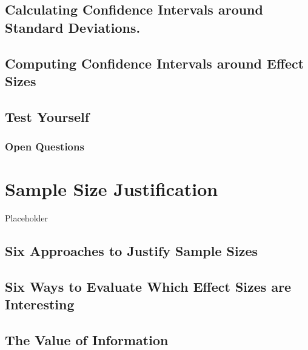 \documentclass[
  oneside]{krantz}
\begin{document}
\hypertarget{calculating-confidence-intervals-around-standard-deviations.}{%
\subsection{Calculating Confidence Intervals around Standard
Deviations.}\label{calculating-confidence-intervals-around-standard-deviations.}}

\hypertarget{computing-confidence-intervals-around-effect-sizes}{%
\subsection{Computing Confidence Intervals around Effect
Sizes}\label{computing-confidence-intervals-around-effect-sizes}}

\hypertarget{test-yourself-5}{%
\subsection{Test Yourself}\label{test-yourself-5}}

\hypertarget{open-questions-5}{%
\subsubsection{Open Questions}\label{open-questions-5}}

\hypertarget{power}{%
\section{Sample Size Justification}\label{power}}

Placeholder

\hypertarget{six-approaches-to-justify-sample-sizes}{%
\subsection{Six Approaches to Justify Sample
Sizes}\label{six-approaches-to-justify-sample-sizes}}

\hypertarget{six-ways-to-evaluate-which-effect-sizes-are-interesting}{%
\subsection{Six Ways to Evaluate Which Effect Sizes are
Interesting}\label{six-ways-to-evaluate-which-effect-sizes-are-interesting}}

\hypertarget{the-value-of-information}{%
\subsection{The Value of Information}\label{the-value-of-information}}
\end{document}
